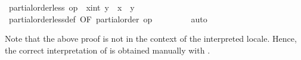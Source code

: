 \begin{isabellebody}
\ {\isachardoublequoteopen}partial{\isacharunderscore}order{\isachardot}less\ op\ {\isasymle}\ {\isacharparenleft}x{\isacharcolon}{\isacharcolon}int{\isacharparenright}\ y\ {\isacharequal}\ {\isacharparenleft}x\ {\isacharless}\ y{\isacharparenright}{\isachardoublequoteclose}\isanewline
\ \ \ \ \ \ \isamarkupfalse%
\ partial{\isacharunderscore}order{\isachardot}less{\isacharunderscore}def\ {\isacharbrackleft}OF\ {\isacharbackquoteopen}partial{\isacharunderscore}order\ op\ {\isasymle}{\isacharbackquoteclose}{\isacharbrackright}\isanewline
\ \ \ \ \ \ \isamarkupfalse%
\ auto\isanewline
\ \ \isamarkupfalse%
%
\endisatagvisible
{\isafoldvisible}%
%
\isadelimvisible
%
\endisadelimvisible
%
\begin{isamarkuptext}%
Note that the above proof is not in the context of the
  interpreted locale.  Hence, the correct interpretation of  is obtained manually with .%
\end{isamarkuptext}%
\isamarkuptrue%
%
\isadelimtheory
%
\endisadelimtheory
%
\isatagtheory
{}\isamarkupfalse%
%
\endisatagtheory
{\isafoldtheory}%
%
\isadelimtheory
%
\endisadelimtheory
\isanewline
\end{isabellebody}%
